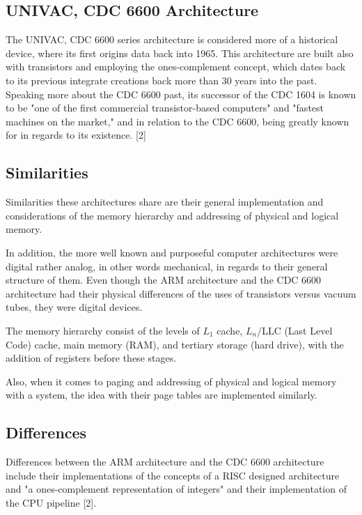 \documentclass[letterpaper,10pt,onecolumn,compsoc]{IEEEtran}
\begin{document}
\subsection{UNIVAC, CDC 6600 Architecture}

\noindent
The UNIVAC, CDC 6600 series architecture is considered more of a historical device, where its first origins data back into 1965. This architecture are built also with transistors and employing the ones-complement concept, which dates back to its previous integrate creations back more than 30 years into the past. Speaking more about the CDC 6600 past, its successor of the CDC 1604 is known to be "one of the first commercial transistor-based computers" and "fastest machines on the market," and in relation to the CDC 6600, being greatly known for in regards to its existence. [2]

\subsection{Similarities}

\noindent
Similarities these architectures share are their general implementation and considerations of the memory hierarchy and addressing of physical and logical memory. 

\noindent
In addition, the more well known and purposeful computer architectures were digital rather analog, in other words mechanical, in regards to their general structure of them. Even though the ARM architecture and the CDC 6600 architecture had their physical differences of the uses of transistors versus vacuum tubes, they were digital devices.

\noindent
The memory hierarchy consist of the levels of $L_1$ cache, $L_n$/LLC (Last Level Code) cache, main memory (RAM), and tertiary storage (hard drive), with the addition of registers before these stages. 

\noindent
Also, when it comes to paging and addressing of physical and logical memory with a system, the idea with their page tables are implemented similarly. 

\subsection{Differences}

\noindent
Differences between the ARM architecture and the CDC 6600 architecture include their implementations of the concepts of a RISC designed architecture and "a ones-complement representation of integers" and their implementation of the CPU pipeline [2].
\end{document}

